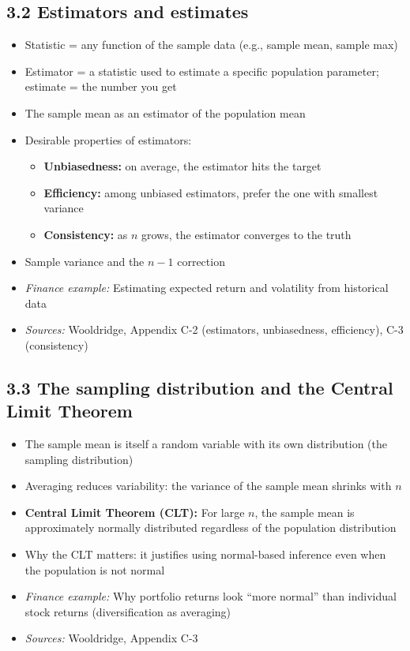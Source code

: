 \documentclass[letterpaper,10pt]{article}
\begin{document}
\subsection*{3.2 Estimators and estimates}
\begin{itemize}
    \item Statistic = any function of the sample data (e.g., sample mean, sample max)
    \item Estimator = a statistic used to estimate a specific population parameter; estimate = the number you get
    \item The sample mean as an estimator of the population mean
    \item Desirable properties of estimators:
    \begin{itemize}
        \item \textbf{Unbiasedness:} on average, the estimator hits the target
        \item \textbf{Efficiency:} among unbiased estimators, prefer the one with smallest variance
        \item \textbf{Consistency:} as $n$ grows, the estimator converges to the truth
    \end{itemize}
    \item Sample variance and the $n-1$ correction
    \item \textit{Finance example:} Estimating expected return and volatility from historical data
    \item \textit{Sources:} Wooldridge, Appendix C-2 (estimators, unbiasedness, efficiency), C-3 (consistency)
\end{itemize}

\subsection*{3.3 The sampling distribution and the Central Limit Theorem}
\begin{itemize}
    \item The sample mean is itself a random variable with its own distribution (the sampling distribution)
    \item Averaging reduces variability: the variance of the sample mean shrinks with $n$
    \item \textbf{Central Limit Theorem (CLT):} For large $n$, the sample mean is approximately normally distributed regardless of the population distribution
    \item Why the CLT matters: it justifies using normal-based inference even when the population is not normal
    \item \textit{Finance example:} Why portfolio returns look ``more normal'' than individual stock returns (diversification as averaging)
    \item \textit{Sources:} Wooldridge, Appendix C-3
\end{itemize}
\end{document}
